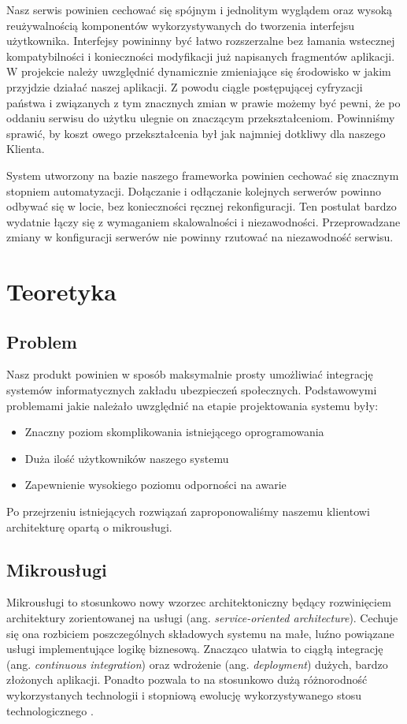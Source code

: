 \documentclass[licencjacka]{pracamgr}
\begin{document}
Nasz serwis powinien cechować się spójnym i jednolitym wyglądem oraz wysoką
reużywalnością komponentów wykorzystywanych do tworzenia interfejsu użytkownika.
Interfejsy powininny być łatwo rozszerzalne bez łamania wstecznej kompatybilności
i konieczności modyfikacji już napisanych fragmentów aplikacji. W projekcie
należy uwzględnić dynamicznie zmieniające się środowisko w jakim przyjdzie działać
naszej aplikacji. Z powodu ciągle postępującej cyfryzacji państwa i związanych z
tym znacznych zmian w prawie możemy być pewni, że po oddaniu serwisu do użytku
ulegnie on znaczącym przekształceniom. Powinniśmy sprawić, by koszt owego przekształcenia
był jak najmniej dotkliwy dla naszego Klienta.

System utworzony na bazie naszego frameworka powinien cechować się znacznym stopniem
automatyzacji. Dołączanie i odłączanie kolejnych serwerów powinno odbywać się w locie,
bez konieczności ręcznej rekonfiguracji. Ten postulat bardzo wydatnie łączy się z
wymaganiem skalowalności i niezawodności. Przeprowadzane zmiany w konfiguracji serwerów
nie powinny rzutować na niezawodność serwisu.

\chapter{Teoretyka}

\section{Problem}

Nasz produkt powinien w sposób maksymalnie prosty umożliwiać integrację systemów
informatycznych zakładu ubezpieczeń społecznych. Podstawowymi problemami jakie
należało uwzględnić na etapie projektowania systemu były:
\begin{itemize}
	\item Znaczny poziom skomplikowania istniejącego oprogramowania
	\item Duża ilość użytkowników naszego systemu
	\item Zapewnienie wysokiego poziomu odporności na awarie
\end{itemize}
Po przejrzeniu istniejących rozwiązań zaproponowaliśmy naszemu klientowi
architekturę opartą o mikrousługi.

\section{Mikrousługi}

Mikrousługi to stosunkowo nowy wzorzec architektoniczny będący rozwinięciem
architektury zorientowanej na usługi (ang. \textit{service-oriented architecture}).
Cechuje się ona rozbiciem poszczególnych składowych systemu na małe, luźno powiązane
usługi implementujące logikę biznesową. Znacząco ułatwia to ciągłą integrację (ang.
\textit{continuous integration}) oraz wdrożenie (ang. \textit{deployment}) dużych,
bardzo złożonych aplikacji. Ponadto pozwala to na stosunkowo dużą różnorodność
wykorzystanych technologii i stopniową ewolucję wykorzystywanego stosu technologicznego
\cite{microsvc}.
\end{document}
